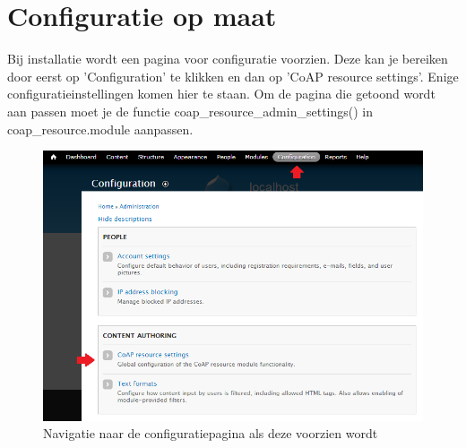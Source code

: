 \section{Configuratie op maat} \label{configuratie}
Bij installatie wordt een pagina voor configuratie voorzien. Deze kan je bereiken door eerst op 'Configuration' te klikken en dan op 'CoAP resource settings'. Enige configuratieinstellingen komen hier te staan. Om de pagina die getoond wordt aan passen moet je de functie coap\_resource\_admin\_settings() in coap\_resource.module aanpassen.
\begin{figure}[h!]
\vspace{10pt}
\includegraphics[width=1\textwidth]{fig/Configuratie}
\vspace{-30pt}
\caption{Navigatie naar de configuratiepagina als deze voorzien wordt}
\vspace{-10pt}
\end{figure}

